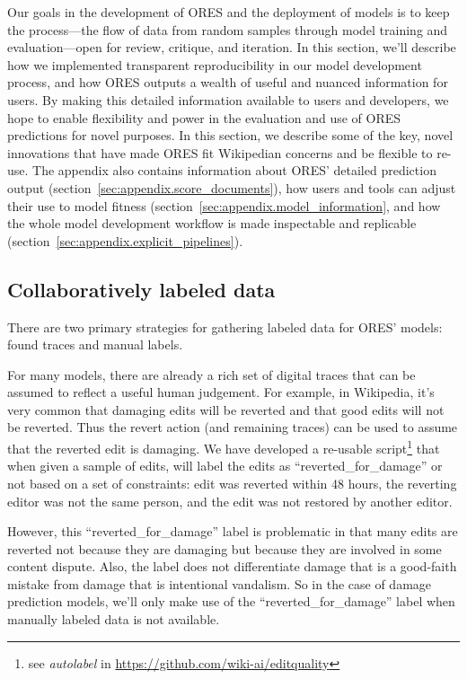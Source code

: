 Our goals in the development of ORES and the deployment of models is to keep the process---the flow of data from random samples through model training and evaluation---open for review, critique, and iteration.  In this section, we'll describe how we implemented transparent reproducibility in our model development process, and how ORES outputs a wealth of useful and nuanced information for users.  By making this detailed information available to users and developers, we hope to enable flexibility and power in the evaluation and use of ORES predictions for novel purposes.  In this section, we describe some of the key, novel innovations that have made ORES fit Wikipedian concerns and be flexible to re-use.  The appendix also contains information about ORES' detailed prediction output (section~\ref{sec:appendix.score_documents}), how users and tools can adjust their use to model fitness (section~\ref{sec:appendix.model_information}, and how the whole model development workflow is made inspectable and replicable (section~\ref{sec:appendix.explicit_pipelines}).

\subsection{Collaboratively labeled data}
There are two primary strategies for gathering labeled data for ORES' models: found traces and manual labels.

 For many models, there are already a rich set of digital traces that can be assumed to reflect a useful human judgement.  For example, in Wikipedia, it's very common that damaging edits will be reverted and that good edits will not be reverted.  Thus the revert action (and remaining traces) can be used to assume that the reverted edit is damaging.  We have developed a re-usable script\footnote{see \emph{autolabel} in \url{https://github.com/wiki-ai/editquality}} that when given a sample of edits, will label the edits as ``reverted\_for\_damage'' or not based on a set of constraints: edit was reverted within 48 hours, the reverting editor was not the same person, and the edit was not restored by another editor.

However, this ``reverted\_for\_damage'' label is problematic in that many edits are reverted not because they are damaging but because they are involved in some content dispute.  Also, the label does not differentiate damage that is a good-faith mistake from damage that is intentional vandalism.  So in the case of damage prediction models, we'll only make use of the ``reverted\_for\_damage'' label when manually labeled data is not available.

